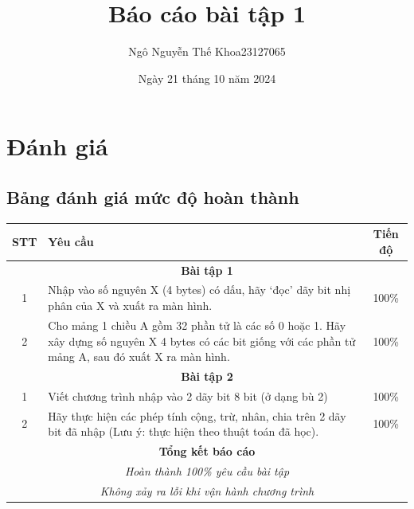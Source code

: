 \documentclass[a4paper,12pt]{report}
\title{Báo cáo bài tập 1}
\author{\begin{tabular}{r c}
  Ngô Nguyễn Thế Khoa & 23127065
  \end{tabular}}
\date{Ngày 21 tháng 10 năm 2024}
\begin{document}

\tableofcontents\thispagestyle{empty}

\pagebreak
\section{Đánh giá}
\subsection*{Bảng đánh giá mức độ hoàn thành}
\begin{center}
	\renewcommand{\arraystretch}{1.5}
	\begin{tabular}{|c|p{}|c|}
		\hline
		\textbf{STT} & \textbf{Yêu cầu}                                                                                                                                           & \textbf{Tiến độ} \\\hline
		\multicolumn{3}{|c|}{\textbf{Bài tập 1}}                                                                                                                                                     \\\hline
		1            & Nhập vào số nguyên X (4 bytes) có dấu, hãy `đọc' dãy bit nhị phân của X và xuất ra màn hình.                                                               & 100\%            \\\hline
		2            & Cho mảng 1 chiều A gồm 32 phần tử là các số 0 hoặc 1. Hãy xây dựng số nguyên X 4 bytes có các bit giống với các phần tử mảng A, sau đó xuất X ra màn hình. & 100\%            \\\hline
		\multicolumn{3}{|c|}{\textbf{Bài tập 2}}                                                                                                                                                     \\\hline
		1            & Viết chương trình nhập vào 2 dãy bit 8 bit (ở dạng bù 2)                                                                                                   & 100\%            \\\hline
		2            & Hãy thực hiện các phép tính cộng, trừ, nhân, chia trên 2 dãy bit đã nhập (Lưu ý: thực hiện theo thuật toán đã học).                                        & 100\%            \\\hline
		\multicolumn{3}{|c|}{\textbf{Tổng kết báo cáo}}                                                                                                                                              \\
		\multicolumn{3}{|c|}{\textsl{Hoàn thành 100\% yêu cầu bài tập}}                                                                                                                              \\
		\multicolumn{3}{|c|}{\textsl{Không xảy ra lỗi khi vận hành chương trình}}                                                                                                                    \\\hline
	\end{tabular}
\end{center}
\end{document}
